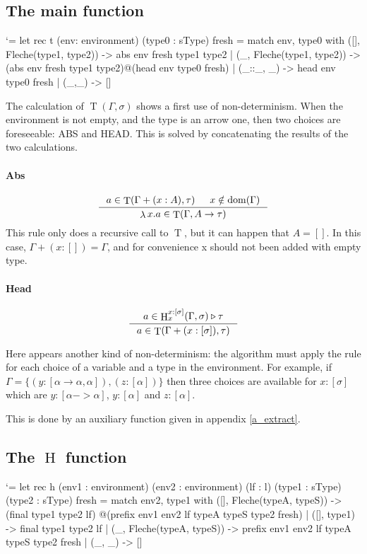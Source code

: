 \documentclass{article}
\let\origlstlisting=\lstlisting
\let\endoriglstlisting=\endlstlisting
\renewenvironment{lstlisting}
{\mathcode`\-=\hyphenmathcode
    \everymath{}\mathsurround=0pt\origlstlisting}
{\endoriglstlisting}
\DeclareMathOperator{\iT}{T}
\DeclareMathOperator{\iH}{H}
\DeclareMathOperator{\iDom}{dom}
\DeclareMathOperator{\iLambda}{\lambda}
\begin{document}
\subsection{The main function}
    
\begin{lstlisting}
let rec t (env: environment) (type0 : sType) fresh =
match env, type0 with
  ([], Fleche(type1, type2)) -> 
        abs env fresh type1 type2
  | (_, Fleche(type1, type2)) -> 
        (abs env fresh type1 type2)@(head env type0 fresh)
  | (_::_, _) -> head env type0 fresh
  | (_,_) -> []
\end{lstlisting}

The calculation of $\iT(\Gamma, \sigma)$ shows a first use of non-determinism. When the environment is not empty, and the type is an arrow one, then two choices are foreseeable: ABS and HEAD.  This is solved by concatenating the results of the two calculations.

\paragraph{Abs}
\begin{displaymath}
    \inference[]{a \in \iT(\Gamma + (x : A), \tau) & x \notin \iDom(\Gamma)}{\iLambda x.a \in \iT(\Gamma, A \rightarrow \tau)}
\end{displaymath}
This rule only does a recursive call to $\iT$, but it can happen that $A = []$. In this case, $\Gamma + (x : []) = \Gamma$, and for convenience x should not been added with empty type. 

\paragraph{Head}
\begin{displaymath}
    \inference[]{a \in \iH^{x:[\sigma]}_x(\Gamma, \sigma) \triangleright \tau}{a \in\iT(\Gamma + (x:[\sigma]), \tau) }
\end{displaymath}

Here appears another kind of non-determinism: the algorithm must apply the rule for each choice of a variable and a type in the environment. For example, if $\Gamma = \{(y : [\alpha \rightarrow \alpha, \alpha]), (z : [\alpha])\}$ then three choices are available for $x:[\sigma]$ which are $y : [\alpha -> \alpha]$, $y : [\alpha]$ and $z : [\alpha]$.

This is done by an auxiliary function given in appendix \ref{a_extract}.

\subsection{The $\iH$ function}
\begin{lstlisting}
let rec h (env1 : environment) (env2 : environment)
    (lf : l) (type1 : sType) (type2 : sType) fresh =
  match env2, type1 with
    ([], Fleche(typeA, typeS)) -> 
        (final type1 type2 lf)
            @(prefix env1 env2 lf typeA typeS type2 fresh)
    | ([], type1) -> final type1 type2 lf
    | (_, Fleche(typeA, typeS)) -> 
        prefix env1 env2 lf typeA typeS type2 fresh
    | (_, _) -> []
\end{lstlisting}
\end{document}
